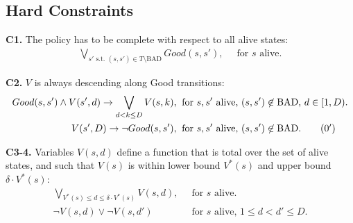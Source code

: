 \documentclass[a4paper]{article}
\newcommand{\smallpar}[1]{{\vspace{10pt}\noindent \bf #1.}}
\newcommand{\badtx}{\ensuremath{\mathrm{BAD}}}
\begin{document}


\subsection{Hard Constraints}

\smallpar{C1}
The policy has to be complete with respect to all alive states:
\begin{align}
\bigvee_{s' \text{ s.t. } (s, s') \in T \setminus \badtx} Good(s, s'),&\;\; \text{for $s$ alive.}
\end{align}


\smallpar{C2} $V$ is always descending along Good transitions:
\begin{align}
 Good(s, s') \land V(s', d) \rightarrow \bigvee_{d < k \leq D} V(s, k),&\;\; \text{for $s, s'$ alive, $(s, s') \not\in \badtx$, $d \in [1, D)$.} \\
 V(s', D) \rightarrow \neg Good(s, s'),&\;\; \text{for $s, s'$ alive, $(s, s') \not\in \badtx$.} \tag{\theequation${}^\prime$}
\end{align}



\smallpar{C3-4}
Variables $V(s, d)$ define a function that is total over the set of alive states,
and such that $V(s)$ is within lower bound $V^*(s)$ and upper bound $\delta \cdot V^*(s)$:
\begin{align}
 \bigvee_{V^*(s) \leq d \leq \delta \cdot V^*(s)} V(s,d),&\;\; \text{for $s$ alive.} \\
 \neg V(s, d) \lor \neg V(s, d')&\;\; \text{for $s$ alive, $1 \leq d < d' \leq D$.}
\end{align}
\end{document}
